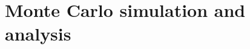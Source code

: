 \documentclass{article}
\begin{document}

\section{Monte Carlo simulation and analysis}
\label{app:monte-carlo}



\clearpage
\end{document}
